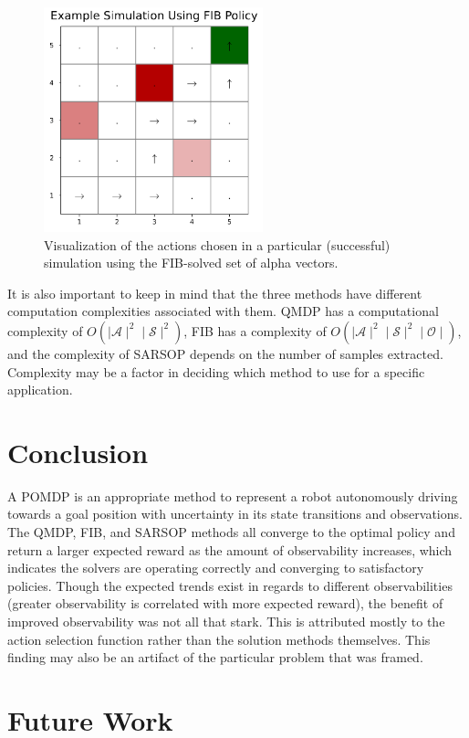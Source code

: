 \documentclass{article}
\begin{document}
\begin{figure}
    \centering
    \includegraphics[width=2.5in]{fibpolicy.png}
    \caption{Visualization of the actions chosen in a particular (successful) simulation using the FIB-solved set of alpha vectors.}
    \label{fig:fib_policy}
\end{figure}

It is also important to keep in mind that the three methods have different computation complexities associated with them.  QMDP has a computational complexity of $O(\mid\mathcal{A}\mid ^2\mid\mathcal{S}\mid^2)$, FIB has a complexity of $O(\mid\mathcal{A}\mid ^2\mid\mathcal{S}\mid ^2\mid\mathcal{O}\mid)$, and the complexity of SARSOP depends on the number of samples extracted.  Complexity may be a factor in deciding which method to use for a specific application.

\section*{Conclusion}
A POMDP is an appropriate method to represent a robot autonomously driving towards a goal position with uncertainty in its state transitions and observations.  The QMDP, FIB, and SARSOP methods all converge to the optimal policy and return a larger expected reward as the amount of observability increases, which indicates the solvers are operating correctly and converging to satisfactory policies.  Though the expected trends exist in regards to different observabilities (greater observability is correlated with more expected reward), the benefit of improved observability was not all that stark. This is attributed mostly to the action selection function rather than the solution methods themselves.  This finding may also be an artifact of the particular problem that was framed.

\section*{Future Work}
\end{document}
